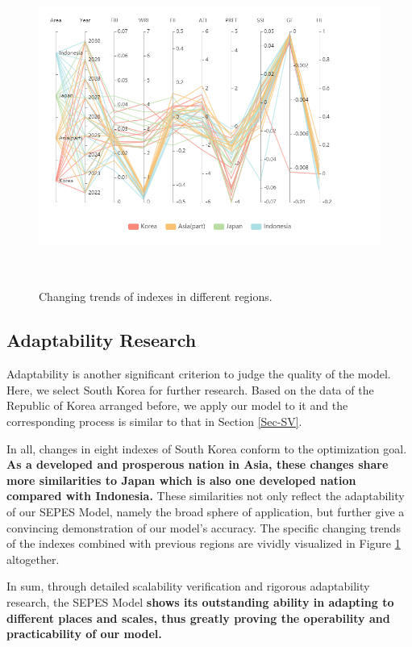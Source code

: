 \documentclass{mcmthesis}
\begin{document}
\begin{figure}[H]
	\centering
	\includegraphics[height=10.5cm]{echarts (12).png} 
	\caption{Changing trends of indexes in different regions.}
	\label{fig:cool}
\end{figure}

\subsection{Adaptability Research}

Adaptability is another significant criterion to judge the quality of the model. Here, we select South Korea for further research. Based on the data of the Republic of Korea arranged before, we apply our model to it and the corresponding process is similar to that in Section \ref{Sec-SV}. 

In all, changes in eight indexes of South Korea conform to the optimization goal. \textbf{As a developed and prosperous nation in Asia, these changes share more similarities to Japan which is also one developed nation compared with Indonesia.} These similarities not only reflect the adaptability of our SEPES Model, namely the broad sphere of application, but further give a convincing demonstration of our model's accuracy. The specific changing trends of the indexes combined with previous regions are vividly visualized in Figure \ref{fig:cool} altogether. 

In sum, through detailed scalability verification and rigorous adaptability research, the SEPES Model \textbf{shows its outstanding ability in adapting to different places and scales, thus greatly proving the operability and practicability of our model. 
}
\end{document}
